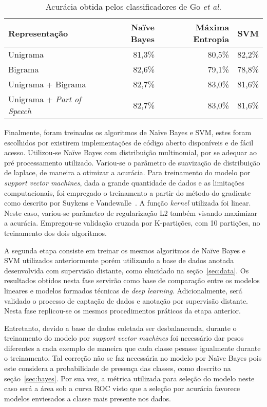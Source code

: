 \begin{table}[h]
    \begin{center}
        \begin{tabular}{| l | r | r | r |}
        \hline
        \textbf{Representação} & \textbf{Naïve Bayes} & \textbf{Máxima Entropia} & \textbf{SVM} \\ \hline
        Unigrama & 81,3\% & 80,5\% & 82,2\% \\ \hline
        Bigrama &  82,6\% & 79,1\% & 78,8\% \\ \hline
        Unigrama + Bigrama & 82,7\% & 83,0\% & 81,6\% \\ \hline
        Unigrama + \textit{Part of Speech} & 82,7\% & 83,0\% & 81,6\% \\ \hline
        \end{tabular}
        \caption{Acurácia obtida pelos classificadores de Go \textit{et al.}}
        \label{tab:go}
    \end{center}
\end{table}

Finalmente, foram treinados os algoritmos de Naïve Bayes e SVM, estes foram escolhidos por existirem implementações de
código aberto disponíveis e de fácil acesso.
Utilizou-se Naïve Bayes com distribuição multinomial, por se adequar ao pré processamento utilizado.
Variou-se o parâmetro de suavização de distribuição de laplace, de maneira a otimizar a acurácia.
Para treinamento do modelo por \textit{support vector machines}, dada a grande quantidade de dados e as limitações
computacionais, foi empregado o treinamento a partir do método do gradiente como descrito por Suykens e
Vandewalle~\cite{suykens99}.
A função \textit{kernel} utilizada foi linear.
Neste caso, variou-se parâmetro de regularização L2 também visando maximizar a acurácia.
Empregou-se validação cruzada por K-partições, com 10 partições, no treinamento dos dois algoritmos.

A segunda etapa consiste em treinar os mesmos algoritmos de Naïve Bayes e SVM utilizados anteriormente porém utilizando
a base de dados anotada desenvolvida com supervisão distante, como elucidado na seção~\ref{sec:data}.
Os resultados obtidos nesta fase servirão como base de comparação entre os modelos lineares e modelos formados técnicas
de \textit{deep learning}.
Adicionalmente, será validado o processo de captação de dados e anotação por supervisão distante.
Nesta fase replicou-se os mesmos procedimentos práticos da etapa anterior.

Entretanto, devido a base de dados coletada ser desbalanceada, durante o treinamento do modelo por
\textit{support vector machines} foi necessário dar pesos diferentes a cada exemplo de maneira que cada classe pesasse
igualmente durante o treinamento.
Tal correção não se faz necessária no modelo por Naïve Bayes pois este considera a probabilidade de presença das classes,
como descrito na seção~\ref{sec:bayes}.
Por sua vez, a métrica utilizada para seleção do modelo neste caso será a área sob a curva ROC visto que a seleção por
acurácia favorece modelos enviesados a classe mais presente nos dados.

